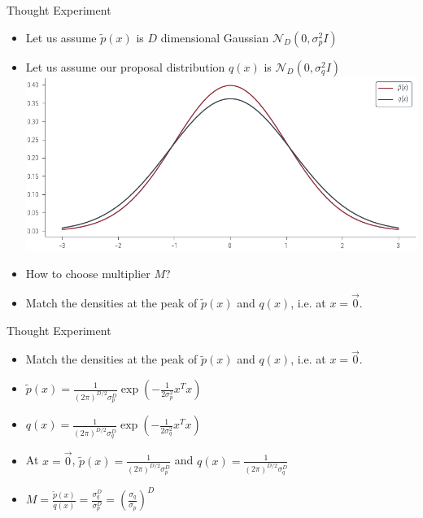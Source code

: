 \documentclass{beamer}
\begin{document}
\begin{frame}{Thought Experiment}
    \begin{itemize}
        \item Let us assume $\tilde{p}(x)$ is $D$ dimensional Gaussian $\mathcal{N}_D(0, \sigma_p^2 I)$
        \pause \item Let us assume our proposal distribution $q(x)$ is $\mathcal{N}_D(0, \sigma_q^2 I)$
        \pause \includegraphics[width=\textwidth]{../figures/sampling/rejection-sampling-gaussian-p-q.pdf}
        \item How to choose multiplier $M$?
        \item Match the densities at the peak of $\tilde{p}(x)$ and $q(x)$, i.e. at $x = \vec{0}$.
    \end{itemize}

    
\end{frame}

\begin{frame}{Thought Experiment}
    \begin{itemize}
        \item Match the densities at the peak of $\tilde{p}(x)$ and $q(x)$, i.e. at $x = \vec{0}$.
        \pause \item $\tilde{p}(x) = \frac{1}{(2\pi)^{D/2} \sigma_p^D} \exp(-\frac{1}{2\sigma_p^2} x^T x)$
        \pause \item $q(x) = \frac{1}{(2\pi)^{D/2} \sigma_q^D} \exp(-\frac{1}{2\sigma_q^2} x^T x)$
        \pause \item At $x = \vec{0}$, $\tilde{p}(x) = \frac{1}{(2\pi)^{D/2} \sigma_p^D}$ and $q(x) = \frac{1}{(2\pi)^{D/2} \sigma_q^D}$
        \pause \item $M = \frac{\tilde{p}(x)}{q(x)} = \frac{\sigma_q^D}{\sigma_p^D} = (\frac{\sigma_q}{\sigma_p})^D$
    \end{itemize}

    
\end{frame}
\end{document}
